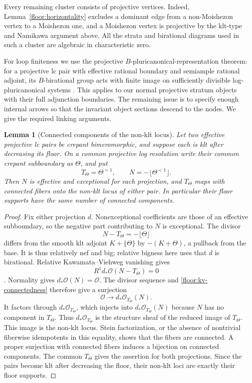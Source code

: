\documentclass[11pt,letterpaper]{article}
\newtheorem{lemma}[theorem]{Lemma}
\theoremstyle{definition}
\theoremstyle{remark}
\begin{document}
Every remaining cluster consists of projective vertices.  Indeed,
Lemma~\ref{floor:horizontality} excludes a dominant edge from a
non-Moishezon vertex to a Moishezon one, and a Moishezon vertex is
projective by the klt-type and Namikawa argument above.  All the
strata and birational diagrams used in such a cluster are
algebraic in characteristic zero.

For loop finiteness we use the projective
$B$-pluricanonical-representation theorem: for a projective lc
pair with effective rational boundary and semiample rational
adjoint, its $B$-birational group acts with finite image on
sufficiently divisible log-pluricanonical systems
\cite[Theorem~1.1]{FujinoGongyoPluricanonical}.  This applies to
our normal projective stratum objects with their full
adjunction boundaries.  The remaining issue is to specify enough
internal arrows so that the invariant object sections descend
to the nodes.  We give the required linking arguments.

\begin{lemma}[Connected components of the non-klt locus]
\label{floor:nklt-components}
Let two effective projective lc pairs be crepant bimeromorphic,
and suppose each is klt after decreasing its floor.  On a common
projective log resolution write their common crepant
subboundary as $\Theta$, and put
\[
 T_\Theta=\Theta^{=1},\qquad
 N=-\lfloor\Theta^{<1}\rfloor.
\]
Then $N$ is effective and exceptional for each projection, and
$T_\Theta$ maps with connected fibers onto the non-klt locus
of either pair.  In particular their floor supports have the
same number of connected components.
\end{lemma}

\begin{proof}
Fix either projection $d$.  Nonexceptional coefficients are
those of an effective subboundary, so the negative part
contributing to $N$ is exceptional.  The divisor
\[
 N-T_\Theta=-\lfloor\Theta\rfloor
\]
differs from the smooth klt adjoint $K+\{\Theta\}$ by
$-(K+\Theta)$, a pullback from the base.  It is thus relatively
nef and big; relative bigness here uses that $d$ is birational.
Relative Kawamata--Viehweg vanishing gives
\begin{equation}
 \label{floor:kv-connectedness}
 R^1d_*\mathcal{O}(N-T_\Theta)=0
\end{equation}
\cite{KawamataViehwegVanishing}.  Normality gives
$d_*\mathcal{O}(N)=\mathcal{O}$.  The divisor sequence and
\eqref{floor:kv-connectedness} therefore give a surjection
\[
 \mathcal{O}\longrightarrow d_*\mathcal{O}_{T_\Theta}(N).
\]
It factors through $d_*\mathcal{O}_{T_\Theta}$, which injects into
$d_*\mathcal{O}_{T_\Theta}(N)$ because $N$ has no component in
$T_\Theta$.  Thus $d_*\mathcal{O}_{T_\Theta}$ is the structure
sheaf of the reduced image of $T_\Theta$.  This image is
the non-klt locus.  Stein factorization, or the absence of
nontrivial fiberwise idempotents in this equality, shows
that the fibers are connected.  A proper surjection with
connected fibers induces a bijection on connected
components.  The common $T_\Theta$ gives the assertion
for both projections.  Since the pairs become klt after
decreasing the floor, their non-klt loci are exactly their
floor supports.
\end{proof}
\end{document}
